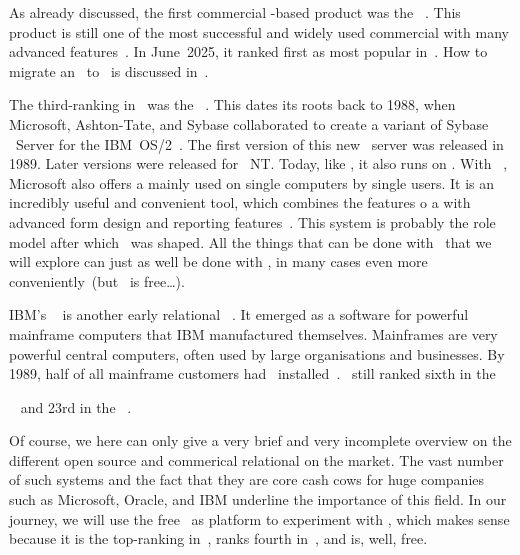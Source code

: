 As already discussed, the first commercial -based product was the \oracleDB~\cite{C20245YOQ,O2007OTHTMIMIOHWCFTPWMIH}.
This product is still one of the most successful and widely used commercial  with many advanced features~\cite{BBDDSY2011ADOODM,KK2021EODATASFHPAP}.
In June~2025, it ranked first as most popular  in~\cite{RS2025DERORD}.
How to migrate an \oracleDB\ to \postgresql\ is discussed in~\cite{KO2023DMFOTP}.

The third-ranking  in~\cite{RS2025DERORD} was the \microsoftSqlServer~\cite{P2020MSS2ABG,A2024TSAFMSS2,W2018MSSDB}.
This  dates its roots back to 1988, when Microsoft, Ashton-Tate, and Sybase collaborated to create a variant of Sybase \sql\ Server for the  IBM~OS/2~\cite{W2018MSSDB:TEOMSS}.
The first version of this new \db\ server was released in 1989.
Later versions were released for \microsoftWindows~NT.
Today, like \oracleDB, it also runs on \linux.
With \microsoftAccess~\cite{LF2022MOSBSO2AM3}, Microsoft also offers a  mainly used on single computers by single users.
It is an incredibly useful and convenient tool, which combines the features o a  with advanced form design and reporting features~\cite{SSI2023MA2BTA,B2020HOMA2,UC2021AFD,MM2014RDAMA}.
This system is probably the role model after which \libreofficeBase\ was shaped.
All the things that can be done with \libreofficeBase\ that we will explore can just as well be done with \microsoftAccess, in many cases even more conveniently~(but \libreofficeBase\ is free\dots).

IBM's \ibmDB~\cite{CWDS2007UDLVWE,BBBCCDMMP2016SPTAFOIDFI} is another early relational \dbms~\cite{HS2013THAGOID}.
It emerged as a software for powerful mainframe computers that IBM manufactured themselves.
Mainframes are very powerful central computers, often used by large organisations and businesses.
By 1989, half of all mainframe customers had \ibmDB\ installed~\cite{HS2013THAGOID}.
\ibmDB\ still ranked sixth in the~\begin{noglslink}\end{noglslink}~\cite{RS2025DERORD} and 23rd in the ~\cite{SE:SO:2024DS}.%
%
\endhsection%

Of course, we here can only give a very brief and very incomplete overview on the different open source and commerical relational  on the market.
The vast number of such systems and the fact that they are core cash cows for huge companies such as Microsoft, Oracle, and IBM underline the importance of this field.
In our journey, we will use the free \postgresql\ as platform to experiment with , which makes sense because it is the top-ranking  in~\cite{SE:SO:2024DS}, ranks fourth in~\cite{RS2025DERORD}, and is, well, free.%
%
\endhsection%
%
